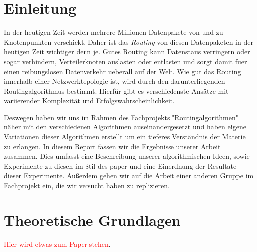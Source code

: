 \documentclass[sigconf, nonacm, review]{acmart}
\begin{document}

\received[\"uberarbeitet]{\textcolor{red}{ausstehend}}

\maketitle

\section{Einleitung}
In der heutigen Zeit werden mehrere Millionen Datenpakete von und zu Knotenpunkten verschickt.
Daher ist das \emph{Routing} von diesen Datenpaketen in der heutigen Zeit wichtiger denn je.
Gutes Routing kann Datenstaus verringern oder sogar verhindern, Verteilerknoten auslasten oder entlasten 
und sorgt damit fuer einen reibungslosen Datenverkehr ueberall auf der Welt.
Wie gut das Routing innerhalb einer Netzwerktopologie ist, wird durch den darunterliegenden Routingalgorithmus bestimmt.
Hierf\"ur gibt es verschiedenste Ans\"atze mit variierender Komplexit\"at und Erfolgswahrscheinlichkeit.

Deswegen haben wir uns im Rahmen des Fachprojekts "Routingalgorithmen" n\"aher mit den verschiedenen Algorithmen auseinandergesetzt und haben eigene Variationen dieser Algorithmen erstellt um ein tieferes Verst\"andnis der Materie zu erlangen.
In diesem Report fassen wir die Ergebnisse unserer Arbeit zusammen.
Dies umfasst eine Beschreibung unserer algorithmischen Ideen, sowie Experimente zu diesen im Stil des paper \cite{foerster2021} und eine Einordnung der Resultate dieser Experimente.
Au\ss erdem gehen wir auf die Arbeit einer anderen Gruppe im Fachprojekt ein, die wir versucht haben zu replizieren.

\section{Theoretische Grundlagen}
\textcolor{red}{Hier wird etwas zum Paper stehen}\cite{foerster2021}.

\end{document}
